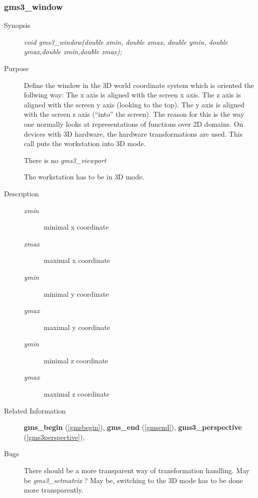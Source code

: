 \subsubsection{gms3\_window\label{gms3window}}
\begin{description}
\item[Synopsis]\mbox{}


{\em void    gms3\_window(double xmin,
double xmax,
double ymin,
double ymax,double zmin,double zmax);\/}
\item[Purpose]\mbox{}


Define the window in  the 3D world coordinate system 
which is oriented the follwing way:
The x axis is aligned with the screen x axis. 
The z axis is aligned with the screen y axis (looking to the top).
The y axis is aligned with the screen z axis (``into'' the screen).
The reason for this is the way one normally looks at representations
of functions over 2D domains.
On devices with 3D hardware, the hardware transformations are used.
This call puts the workstation into 3D mode.

There is no {\em gms3\_viewport\/}

The workstation has to be in 3D mode.

\item[Description]\mbox{}


\begin{description}
\item[{\em xmin\/}]\mbox{}

 minimal x coordinate
\item[{\em xmax\/}]\mbox{}

 maximal x coordinate
\item[{\em ymin\/}]\mbox{}

 minimal y coordinate
\item[{\em ymax\/}]\mbox{}

 maximal y coordinate
\item[{\em ymin\/}]\mbox{}

 minimal z coordinate
\item[{\em ymax\/}]\mbox{}

 maximal z coordinate
\end{description}

\item[Related Information]\mbox{}


{\bf gms\_begin} (\ref{gmsbegin}), 
{\bf gms\_end} (\ref{gmsend}), 
{\bf gms3\_perspective} (\ref{gms3perspective}), 
\item[Bugs]\mbox{}


There should be a more transparent way of transformation handling.
May be {\em gms3\_setmatrix\/} ?
May be, switching to the 3D mode has to be done more transparently.

\end{description}


